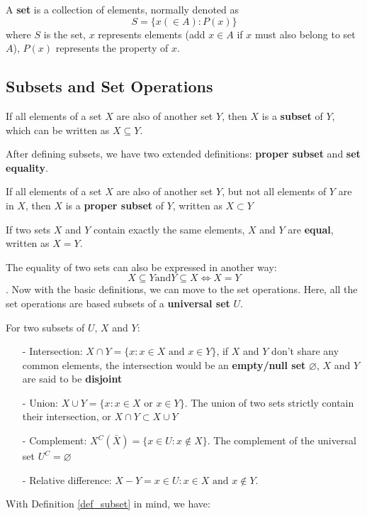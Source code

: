 A \textbf{set} is a collection of elements, normally denoted as
$$
S = \{x (\in A):P(x)\}
$$
where $S$ is the set, $x$ represents elements (add $x\in A$ if $x$ must also belong to set $A$), $P(x)$ represents the property of $x$.

\subsection{Subsets and Set Operations}
\begin{definition}
    If all elements of a set $X$ are also of another set $Y$, then $X$ is a \textbf{subset} of $Y$, which can be written as $X\subseteq Y$.
\end{definition}

After defining subsets, we have two extended definitions: \textbf{proper subset} and \textbf{set equality}.
\begin{definition}
    If all elements of a set $X$ are also of another set $Y$, but not all elements of $Y$ are in $X$, then $X$ is a \textbf{proper subset} of $Y$, written as $X \subset Y$
\end{definition}
\begin{definition}
    If two sets $X$ and $Y$ contain exactly the same elements, $X$ and $Y$ are \textbf{equal}, written as $X=Y$.
\end{definition}

The equality of two sets can also be expressed in another way: $$ X\subseteq Y \text{and} Y\subseteq X \Leftrightarrow X=Y$$.
Now with the basic definitions, we can move to the set operations. Here, all the set operations are based subsets of a \textbf{universal set} $U$.
\begin{definition}\label{def_subset}
    For two subsets of $U$, $X$ and $Y$:
    \begin{enumerate}
        \item[-] Intersection: $X\cap Y=\{x:x\in X \text{ and } x\in Y\}$, if $X$ and $Y$ don't share any common elements, the intersection would be 
        an \textbf{empty/null set} $\varnothing$, $X$ and $Y$ are said to be \textbf{disjoint}
        \item[-] Union: $X\cup Y = \{x:x\in X \text{ or } x\in Y \}$. The union of two sets strictly contain their intersection, or $X\cap Y \subset X\cup Y$
        \item[-] Complement: $X^C(\bar{X}) = \{x\in U:x\notin X\}$. The complement of the universal set $U^C=\varnothing$
        \item[-] Relative difference: $X-Y = {x\in U:x\in X \text{ and } x\notin Y}$.
    \end{enumerate}
\end{definition}

With Definition \ref{def_subset} in mind, we have:
$$